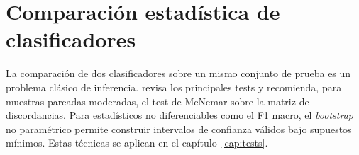 \section{Comparación estadística de clasificadores}

La comparación de dos clasificadores sobre un mismo conjunto de prueba
es un problema clásico de inferencia. \citet{dietterich1998approximate}
revisa los principales tests y recomienda, para muestras pareadas
moderadas, el test de McNemar sobre la matriz de discordancias. Para
estadísticos no diferenciables como el F1 macro, el \emph{bootstrap}
no paramétrico \citep{efron1993introduction} permite construir
intervalos de confianza válidos bajo supuestos mínimos. Estas técnicas
se aplican en el capítulo~\ref{cap:tests}.
